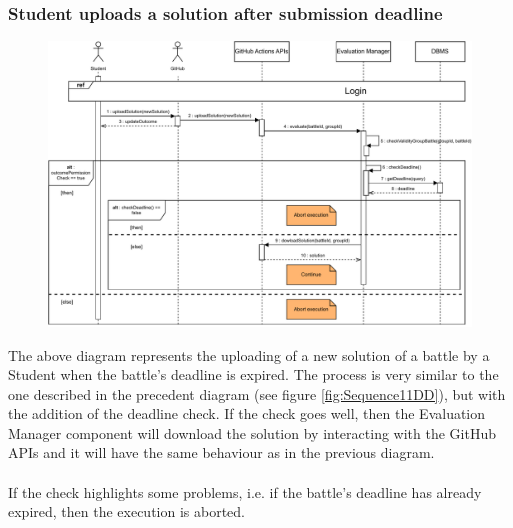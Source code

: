 \documentclass{article}
\begin{document}
{    \subsubsection{Student uploads a solution after submission deadline}
        \begin{figure}[H]
            \centering
            \hspace*{-3cm}\includegraphics[scale=0.62]{Sequence/Sequence12DD.pdf}
            \caption{}
            \label{fig:Sequence12DD}
        \end{figure}


        The above diagram represents the uploading of a new solution
        of a battle by a Student when the battle's deadline is expired.
        The process is very similar to the one described in the precedent diagram (see figure
        \ref{fig:Sequence11DD}), but with the addition of the deadline check.
        If the check goes well, then the Evaluation Manager component will download the solution
        by interacting with the GitHub APIs and it will have the same behaviour as in the
        previous diagram.
        \\ \\
        If the check highlights some problems, i.e. if the battle's deadline has already expired,
        then the execution is aborted.
        \\ \\

}
\end{document}
